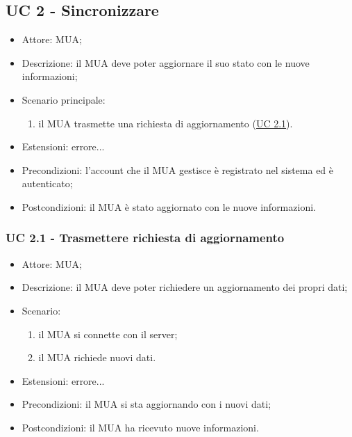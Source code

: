     \subsection{UC 2 - Sincronizzare}  \label{sec: UC 2}
    \begin{itemize}
        \item Attore: MUA;
        \item Descrizione: il MUA deve poter aggiornare il suo stato con le nuove informazioni;
        \item Scenario principale:
            \begin{enumerate}
            \item il MUA trasmette una richiesta di aggiornamento (\hyperref[sec: UC 2.1]{UC 2.1}).
            \end{enumerate}
        \item Estensioni: errore... %
        \item Precondizioni: l'account che il MUA gestisce è registrato nel sistema ed è autenticato;
        \item Postcondizioni: il MUA è stato aggiornato con le nuove informazioni.
    \end{itemize}

    \subsubsection{UC 2.1 - Trasmettere richiesta di aggiornamento} \label{sec: UC 2.1}
    \begin{itemize}
        \item Attore: MUA;
        \item Descrizione: il MUA deve poter richiedere un aggiornamento dei propri dati;
        \item Scenario:
        \begin{enumerate}
        \item il MUA si connette con il server;
        \item il MUA richiede nuovi dati.
        \end{enumerate}
        \item Estensioni: errore... %
        \item Precondizioni: il MUA si sta aggiornando con i nuovi dati;
        \item Postcondizioni: il MUA ha ricevuto nuove informazioni.
    \end{itemize}

